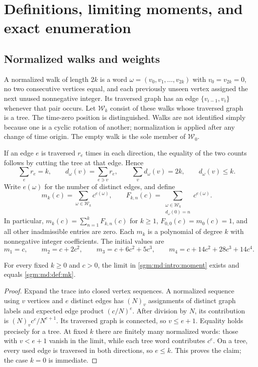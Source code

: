 \documentclass[11pt,letterpaper]{article}
\theoremstyle{remark}\newtheorem{remark}[theorem]{Remark}
\newcommand{\Wc}{\mathcal W}\newcommand{\Uc}{\mathcal U}\newcommand{\Part}{\operatorname{Part}}
\newcommand{\fall}[2]{(#1)_{#2}}\newcommand{\rise}[2]{#1^{\overline{#2}}}
\theoremstyle{definition}\newtheorem{definition}[theorem]{Definition}
\begin{document}
\section{Definitions, limiting moments, and exact enumeration}
\label{sgm:md:sec:definitions}

\subsection{Normalized walks and weights}

A normalized walk of length $2k$ is a word
$\omega=(v_0,v_1,\ldots,v_{2k})$ with $v_0=v_{2k}=0$, no two
consecutive vertices equal, and each previously unseen vertex assigned
the next unused nonnegative integer. Its traversed graph has an edge
$\{v_{i-1},v_i\}$ whenever that pair occurs. Let $\Wc_k$ consist of
these walks whose traversed graph is a tree. The time-zero position
is distinguished. Walks are not identified simply because one is a
cyclic rotation of another; normalization is applied after any change
of time origin. The empty walk is the sole member of $\Wc_0$.

If an edge $e$ is traversed $r_e$ times in each direction, the equality
of the two counts follows by cutting the tree at that edge. Hence
\begin{equation}\label{sgm:md:def:departures}
 \sum_e r_e=k,\qquad
 d_\omega(v)=\sum_{e\ni v}r_e,\qquad
 \sum_v d_\omega(v)=2k,\qquad d_\omega(v)\le k.
\end{equation}
Write $e(\omega)$ for the number of distinct edges, and define
\begin{equation}\label{sgm:md:def:mk}
 m_k(c)=\sum_{\omega\in\Wc_k}c^{e(\omega)},\qquad
 F_{k,n}(c)=\sum_{\substack{\omega\in\Wc_k\\d_\omega(0)=n}}
                                      c^{e(\omega)}.
\end{equation}
In particular, $m_k(c)=\sum_{n=1}^kF_{k,n}(c)$ for $k\ge1$,
$F_{0,0}(c)=m_0(c)=1$, and all other inadmissible entries are zero.
Each $m_k$ is a polynomial of degree $k$ with nonnegative integer
coefficients. The initial values are
\[
 m_1=c,\qquad m_2=c+2c^2,\qquad
 m_3=c+6c^2+5c^3,\qquad
 m_4=c+14c^2+28c^3+14c^4.
\]

\begin{proposition}
\label{sgm:md:def:graphmoment}
For every fixed $k\ge0$ and $c>0$, the limit in
\eqref{sgm:md:intro:moment} exists and equals \eqref{sgm:md:def:mk}.
\end{proposition}
\begin{proof}
Expand the trace into closed vertex sequences. A normalized sequence
using $v$ vertices and $e$ distinct edges has
$\fall{N}{v}$ assignments of distinct graph labels and expected edge
product $(c/N)^e$. After division by $N$, its contribution is
$\fall{N}{v}c^e/N^{e+1}$. Its traversed graph is connected, so
$v\le e+1$. Equality holds precisely for a tree. At fixed $k$ there
are finitely many normalized words: those with $v<e+1$ vanish in the
limit, while each tree word contributes $c^e$. On a tree, every used
edge is traversed in both directions, so $e\le k$. This proves the
claim; the case $k=0$ is immediate.
\end{proof}
\end{document}
